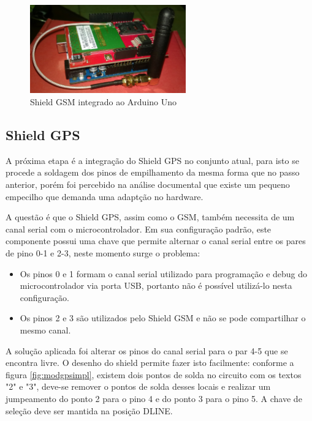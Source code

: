 \begin{figure}[!htb]
\centering
\includegraphics[width=0.6\textwidth]{figures/arduinoAndGSM.jpg}
\caption{Shield GSM integrado ao Arduino Uno}
\label{fig:shieldgsmimpl}
\end{figure}

\newpage
\subsection{Shield GPS}

A próxima etapa é a integração do Shield GPS no conjunto atual, para isto se procede a soldagem dos pinos de empilhamento da mesma forma que no passo anterior, porém foi percebido na análise documental que existe um pequeno empecilho que demanda uma adaptção no hardware.

A questão é que o Shield GPS, assim como o GSM, também necessita de um canal serial com o microcontrolador. Em sua configuração padrão, este componente possui uma chave que permite alternar o canal serial entre os pares de pino 0-1 e 2-3, neste momento surge o problema:

\begin{itemize}
	\item Os pinos 0 e 1 formam o canal serial utilizado para programação e debug do microcontrolador via porta USB, portanto não é possível utilizá-lo nesta configuração.
	\item Os pinos 2 e 3 são utilizados pelo Shield GSM e não se pode compartilhar o mesmo canal.
\end{itemize}

A solução aplicada foi alterar os pinos do canal serial para o par 4-5 que se encontra livre. O desenho do shield permite fazer isto facilmente: conforme a figura \ref{fig:modgpsimpl}, existem dois pontos de solda no circuito com os textos "2" e "3", deve-se remover o pontos de solda desses locais e realizar um jumpeamento do ponto 2 para o pino 4 e do ponto 3 para o pino 5. A chave de seleção deve ser mantida na posição DLINE.

